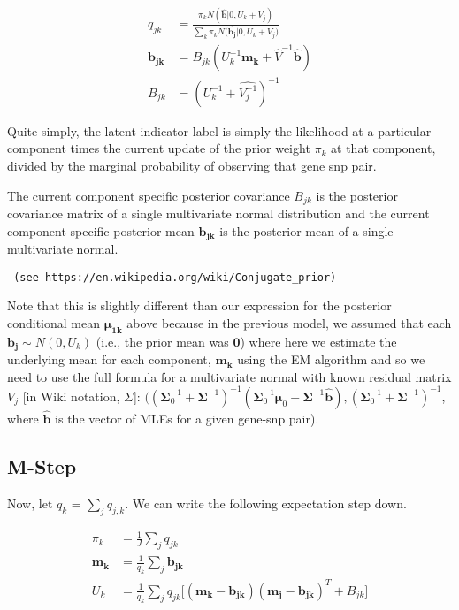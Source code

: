 \documentclass[11pt, oneside]{article}   	%
\begin{document}
\begin{equation}
\begin{align*}
q_{jk} &= \frac{\pi_{k} N (  \hat{\bm{b}} |0,U_{k}+V_{j})}{\sum_{k}{\pi_{k} N (\hat{\bm{b_{j}}}|0,U_{k}+V_{j}})} \\
\bm{b_{jk}} &=  B_{jk} (U_{k}^{-1} \bm{m_{k}}+\hat{V}^{-1}  \hat{\bm{b}}) \\
B_{jk}&=(U_{k}^{-1} + \hat{V_{j}^{-1}})^{-1}
\end{align*}
\end{equation}

Quite simply, the latent indicator label is simply the likelihood at a particular component times the current update of the prior weight $\pi_{k}$ at that component, divided by the marginal probability of observing that gene snp pair.

The current component specific posterior covariance $B_{jk}$ is the posterior covariance matrix of a single multivariate normal distribution and the current component-specific posterior mean $\bm{b_{jk}}$ is the posterior mean of a single multivariate normal. \begin{verbatim} (see https://en.wikipedia.org/wiki/Conjugate_prior)\end{verbatim}

Note that this is slightly different than our expression for the posterior conditional mean $\bm{\mu_{1k}}$ above because in the previous model, we assumed that each $\bm{b_{j}} \sim N(0,U_{k})$ (i.e., the prior mean was $\bm{0}$) where here we estimate the underlying mean for each component, $\bm{m_{k}}$ using the EM algorithm and so we need to use the full formula for a multivariate normal with known residual matrix $V_{j}$ [in Wiki notation, $\Sigma$]: $(\left(\boldsymbol\Sigma_0^{-1} + \boldsymbol\Sigma^{-1}\right)^{-1}\left( \boldsymbol\Sigma_0^{-1}\boldsymbol\mu_0 +  \boldsymbol\Sigma^{-1} \mathbf{\hat{b}} \right),
\left(\boldsymbol\Sigma_0^{-1} + \boldsymbol\Sigma^{-1}\right)^{-1}$, where 
$\mathbf{\hat{b}}$ is the vector of MLEs for a given gene-snp pair).

\subsection{M-Step}
Now, let $q_{k}$ = $\sum_{j}{q_{j,k}}$. We can write the following expectation step down.


\begin{equation}
\begin{align*}
\pi_{k} &= \frac{1}{J}\sum_{j} {q_{jk}}\\
\bm{m_{k}}&=\frac{1}{q_{k}}\sum_{j}{\bm{b_{jk}}}\\
U_{k} &= \frac{1}{q_{k}}\sum_{j} {q_{jk}[(\bm{m_{k}}-\bm{b_{jk}})(\bm{m_{j}}-\bm{b_{jk}})^{T}+B_{jk}}]
\end{align*}
\end{equation}
\end{document}
